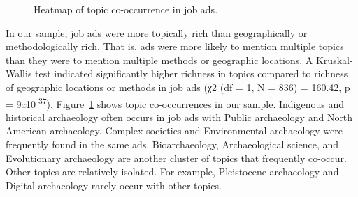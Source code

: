 \documentclass[
  12pt,
]{article}
\begin{document}
\begin{figure}


\caption{\label{fig-show-cooc}Heatmap of topic co-occurrence in job
ads.}

\end{figure}%

In our sample, job ads were more topically rich than geographically or
methodologically rich. That is, ads were more likely to mention multiple
topics than they were to mention multiple methods or geographic
locations. A Kruskal-Wallis test indicated significantly higher richness
in topics compared to richness of geographic locations or methods in job
ads (χ2 (df = 1, N = 836) = 160.42, p =
9\emph{x}10\textsuperscript{-37}). Figure~\ref{fig-show-cooc} shows
topic co-occurrences in our sample. Indigenous and historical
archaeology often occurs in job ads with Public archaeology and North
American archaeology. Complex societies and Environmental archaeology
were frequently found in the same ads. Bioarchaeology, Archaeological
science, and Evolutionary archaeology are another cluster of topics that
frequently co-occur. Other topics are relatively isolated. For example,
Pleistocene archaeology and Digital archaeology rarely occur with other
topics.
\end{document}
